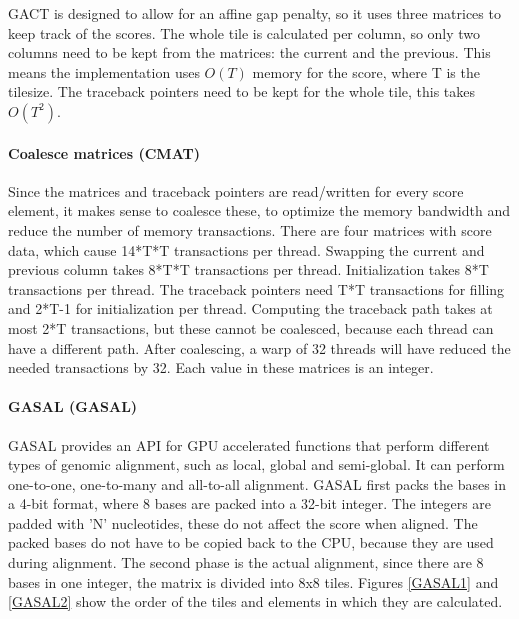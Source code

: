 \documentclass[../main/thesis.tex]{subfiles}
\begin{document}
GACT is designed to allow for an affine gap penalty, so it uses three matrices to keep track of the scores.
The whole tile is calculated per column, so only two columns need to be kept from the matrices: the current and the previous.
This means the implementation uses $O(T)$ memory for the score, where T is the tilesize.
The traceback pointers need to be kept for the whole tile, this takes $O(T^2)$.

\paragraph{Coalesce matrices (CMAT)}
Since the matrices and traceback pointers are read/written for every score element, it makes sense to coalesce these, to optimize the memory bandwidth and reduce the number of memory transactions.
There are four matrices with score data, which cause 14*T*T transactions per thread.
Swapping the current and previous column takes 8*T*T transactions per thread. 
Initialization takes 8*T transactions per thread.
The traceback pointers need T*T transactions for filling and 2*T-1 for initialization per thread.
Computing the traceback path takes at most 2*T transactions, but these cannot be coalesced, because each thread can have a different path.
After coalescing, a warp of 32 threads will have reduced the needed transactions by 32.
Each value in these matrices is an integer.

\paragraph{GASAL (GASAL)}
GASAL \cite{GASAL} provides an API for GPU accelerated functions that perform different types of genomic alignment, such as local, global and semi-global.
It can perform one-to-one, one-to-many and all-to-all alignment.
GASAL first packs the bases in a 4-bit format, where 8 bases are packed into a 32-bit integer.
The integers are padded with 'N' nucleotides, these do not affect the score when aligned.
The packed bases do not have to be copied back to the CPU, because they are used during alignment.
The second phase is the actual alignment, since there are 8 bases in one integer, the matrix is divided into 8x8 tiles.
Figures \ref{GASAL1} and \ref{GASAL2} show the order of the tiles and elements in which they are calculated.


\end{document}
